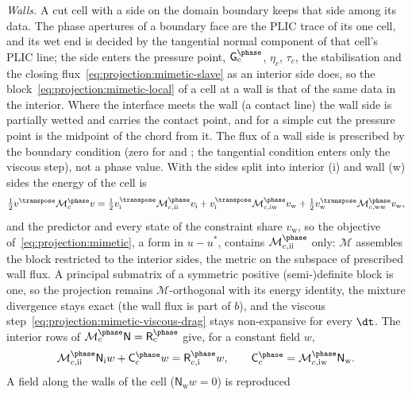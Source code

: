 \emph{Walls.} A cut cell with a side on the domain boundary keeps that side
among its data. The phase apertures of a boundary face are the PLIC trace of
its one cell, and its wet end is decided by the tangential normal component of
that cell's PLIC line; the side enters the pressure point, $\mathsf G^{\phase}_c$,
$\eta_c$, $\tau_c$, the stabilisation and the closing
flux~\cref{eq:projection:mimetic-slave} as an interior side does, so the
block~\cref{eq:projection:mimetic-local} of a cell at a wall is that of the
same data in the interior. Where the interface meets the wall (a contact line)
the wall side is partially wetted and carries the contact point, and for a
simple cut the pressure point is the midpoint of the chord from it. The flux
of a wall side is prescribed by the boundary condition (zero for
 and ; the tangential condition enters only
the viscous step), not a phase value. With the sides split into interior
(i) and wall (w) sides the energy of the cell is
\begin{equation}\label{eq:projection:mimetic-wall}
  \tfrac12v^{\transpose}\mathcal M^{\phase}_cv
  =\tfrac12v_{\mathrm i}^{\transpose}\mathcal M^{\phase}_{c,\mathrm{ii}}v_{\mathrm i}
  +v_{\mathrm i}^{\transpose}\mathcal M^{\phase}_{c,\mathrm{iw}}v_{\mathrm w}
  +\tfrac12v_{\mathrm w}^{\transpose}\mathcal M^{\phase}_{c,\mathrm{ww}}v_{\mathrm w},
\end{equation}
and the predictor and every state of the constraint share $v_{\mathrm w}$, so
the objective of~\cref{eq:projection:mimetic}, a form in $u-u^{*}$, contains
$\mathcal M^{\phase}_{c,\mathrm{ii}}$ only: $\mathcal M$ assembles the block
restricted to the interior sides, the metric on the subspace of prescribed
wall flux. A principal submatrix of a symmetric positive (semi-)definite block
is one, so the projection remains $\mathcal M$-orthogonal with its energy
identity, the mixture divergence stays exact (the wall flux is part of $b$),
and the viscous step~\cref{eq:projection:mimetic-viscous-drag} stays
non-expansive for every $\dt$. The interior rows of $\mathcal M^{\phase}_c\mathsf N=\mathsf R^{\phase}_c$
give, for a constant field $w$,
\begin{equation}\label{eq:projection:mimetic-wall-moment}
  \mathcal M^{\phase}_{c,\mathrm{ii}}\mathsf N_{\mathrm i}w+\mathsf C^{\phase}_cw
  =\mathsf R^{\phase}_{c,\mathrm i}w,\qquad
  \mathsf C^{\phase}_c=\mathcal M^{\phase}_{c,\mathrm{iw}}\mathsf N_{\mathrm w}.
\end{equation}
A field along the walls of the cell ($\mathsf N_{\mathrm w}w=0$) is reproduced
